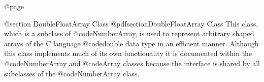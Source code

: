 @page

@section  DoubleFloatArray Class
@pdfsection{DoubleFloatArray Class}
This class, which is a subclass of @code{NumberArray}, is used to
represent arbitrary shaped arrays of the C language @code{double} data
type in an efficient manner.  Although this class implements much of its
own functionality it is documented within the @code{NumberArray} and
@code{Array} classes because the interface is shared by all subclasses
of the @code{NumberArray} class.








